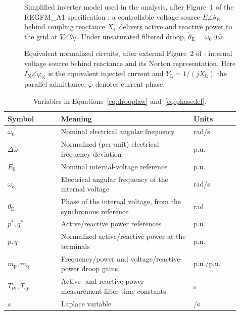 \documentclass[11pt]{article}
\begin{document}
\begin{figure}[tbp]\centering

\caption{Simplified inverter model used in the analysis, after Figure~1 of the REGFM\_A1 specification \cite{du2023a1}: a controllable voltage source $E\angle\theta_{\mathrm{E}}$ behind coupling reactance $X_{\mathrm{L}}$ delivers active and reactive power to the grid at $V\angle\theta_{\mathrm{V}}$. Under unsaturated filtered droop, $\dot\theta_{\mathrm{E}}=\omega_0\Delta\bar{\omega}$.}
\label{fig:gfmcircuit}
\end{figure}

\begin{figure}[tbp]\centering

\caption{Equivalent normalized circuits, after external Figure~2 of \cite{du2023a1}: internal voltage source behind reactance and its Norton representation. Here $I_{\mathrm{N}}\angle\varphi_{\mathrm{N}}$ is the equivalent injected current and $Y_{\mathrm{L}}=1/(jX_{\mathrm{L}})$ the parallel admittance; $\varphi$ denotes current phase.}
\label{fig:gfmequiv}
\end{figure}

\begin{table}[tbp]\centering
\caption{Variables in Equations~\eqref{eq:drooplaw} and~\eqref{eq:phasedef}.}
\label{tab:droopvars}
\small
\begin{tabular}{>{\raggedright\arraybackslash}p{0.21\linewidth}>{\raggedright\arraybackslash}p{0.52\linewidth}>{\raggedright\arraybackslash}p{0.18\linewidth}}\toprule
Symbol & Meaning & Units\\\midrule
$\omega_0$ & Nominal electrical angular frequency & rad/s\\
$\Delta\bar{\omega}$ & Normalized (per-unit) electrical frequency deviation & p.u.\\
$E_0$ & Nominal internal-voltage reference & p.u.\\
$\omega_{\mathrm{e}}$ & Electrical angular frequency of the internal voltage & rad/s\\
$\theta_{\mathrm{E}}$ & Phase of the internal voltage, from the synchronous reference & rad\\
$p^{*},q^{*}$ & Active/reactive power references & p.u.\\
$p,q$ & Normalized active/reactive power at the terminals & p.u.\\
$m_{\mathrm{p}},m_{\mathrm{q}}$ & Frequency/power and voltage/reactive-power droop gains & p.u./p.u.\\
$T_{\mathrm{Pf}},T_{\mathrm{Qf}}$ & Active- and reactive-power measurement-filter time constants & s\\
$s$ & Laplace variable & 1/s\\\bottomrule
\end{tabular}
\end{table}
\end{document}
